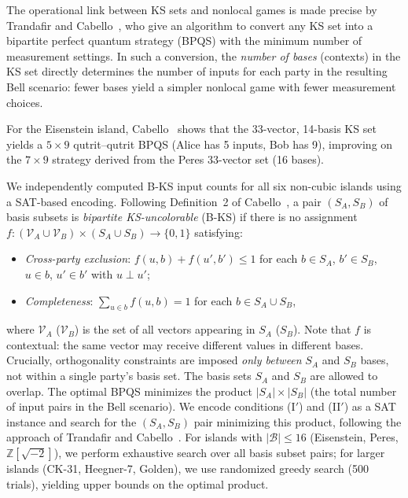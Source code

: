 \documentclass[12pt,a4paper]{article}
\newcommand{\Z}{\mathbb{Z}}
\begin{document}
The operational link between KS sets and nonlocal games is made precise by Trandafir and Cabello~\cite{TrandafirCabello2025optimal}, who give an algorithm to convert any KS set into a bipartite perfect quantum strategy (BPQS) with the minimum number of measurement settings. In such a conversion, the \emph{number of bases} (contexts) in the KS set directly determines the number of inputs for each party in the resulting Bell scenario: fewer bases yield a simpler nonlocal game with fewer measurement choices.

For the Eisenstein island, Cabello~\cite{Cabello2025simplest} shows that the 33-vector, 14-basis KS set yields a $5 \times 9$ qutrit--qutrit BPQS (Alice has 5 inputs, Bob has 9), improving on the $7 \times 9$ strategy derived from the Peres 33-vector set (16 bases).

We independently computed B-KS input counts for all six non-cubic islands using a SAT-based encoding. Following Definition~2 of Cabello~\cite{Cabello2024bipartite}, a pair $(S_A, S_B)$ of basis subsets is \emph{bipartite KS-uncolorable} (B-KS) if there is no assignment $f: (\mathcal{V}_A \cup \mathcal{V}_B) \times (S_A \cup S_B) \to \{0,1\}$ satisfying:
\begin{itemize}
    \item[(I\,$'$)] \emph{Cross-party exclusion}: $f(u,b) + f(u',b') \leq 1$ for each $b \in S_A$, $b' \in S_B$, $u \in b$, $u' \in b'$ with $u \perp u'$;
    \item[(II\,$'$)] \emph{Completeness}: $\sum_{u \in b} f(u,b) = 1$ for each $b \in S_A \cup S_B$,
\end{itemize}
where $\mathcal{V}_A$ ($\mathcal{V}_B$) is the set of all vectors appearing in $S_A$ ($S_B$). Note that $f$ is contextual: the same vector may receive different values in different bases. Crucially, orthogonality constraints are imposed \emph{only between} $S_A$ and $S_B$ bases, not within a single party's basis set. The basis sets $S_A$ and $S_B$ are allowed to overlap. The optimal BPQS minimizes the product $|S_A| \times |S_B|$ (the total number of input pairs in the Bell scenario). We encode conditions (I$'$) and (II$'$) as a SAT instance and search for the $(S_A, S_B)$ pair minimizing this product, following the approach of Trandafir and Cabello~\cite{TrandafirCabello2025optimal}. For islands with $|\mathcal{B}| \leq 16$ (Eisenstein, Peres, $\Z[\sqrt{-2}]$), we perform exhaustive search over all basis subset pairs; for larger islands (CK-31, Heegner-7, Golden), we use randomized greedy search (500 trials), yielding upper bounds on the optimal product.
\end{document}
